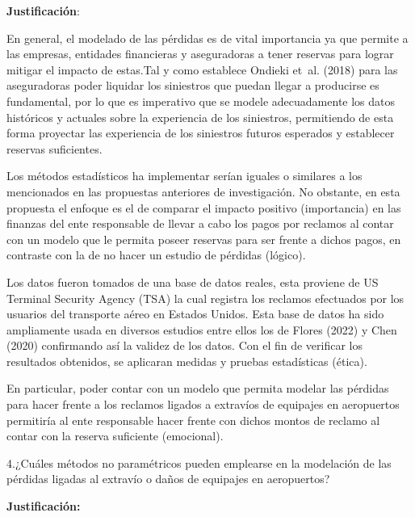 \documentclass[
  letterpaper,
  onepage,
  openany]{scrreprt}
\begin{document}
\textbf{Justificación}:

En general, el modelado de las pérdidas es de vital importancia ya que
permite a las empresas, entidades financieras y aseguradoras a tener
reservas para lograr mitigar el impacto de estas.Tal y como establece
Ondieki et~al. (2018) para las aseguradoras poder liquidar los
siniestros que puedan llegar a producirse es fundamental, por lo que es
imperativo que se modele adecuadamente los datos históricos y actuales
sobre la experiencia de los siniestros, permitiendo de esta forma
proyectar las experiencia de los siniestros futuros esperados y
establecer reservas suficientes.

Los métodos estadísticos ha implementar serían iguales o similares a los
mencionados en las propuestas anteriores de investigación. No obstante,
en esta propuesta el enfoque es el de comparar el impacto positivo
(importancia) en las finanzas del ente responsable de llevar a cabo los
pagos por reclamos al contar con un modelo que le permita poseer
reservas para ser frente a dichos pagos, en contraste con la de no hacer
un estudio de pérdidas (lógico).

Los datos fueron tomados de una base de datos reales, esta proviene de
US Terminal Security Agency (TSA) la cual registra los reclamos
efectuados por los usuarios del transporte aéreo en Estados Unidos. Esta
base de datos ha sido ampliamente usada en diversos estudios entre ellos
los de Flores (2022) y Chen (2020) confirmando así la validez de los
datos. Con el fin de verificar los resultados obtenidos, se aplicaran
medidas y pruebas estadísticas (ética).

En particular, poder contar con un modelo que permita modelar las
pérdidas para hacer frente a los reclamos ligados a extravíos de
equipajes en aeropuertos permitiría al ente responsable hacer frente con
dichos montos de reclamo al contar con la reserva suficiente
(emocional).

4.¿Cuáles métodos no paramétricos pueden emplearse en la modelación de
las pérdidas ligadas al extravío o daños de equipajes en aeropuertos?

\textbf{Justificación:}
\end{document}
